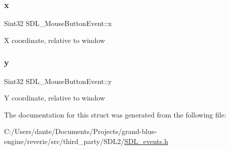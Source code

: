 \subsubsection{\texorpdfstring{x}{x}}
{\footnotesize\ttfamily Sint32 S\+D\+L\+\_\+\+Mouse\+Button\+Event\+::x}

X coordinate, relative to window \mbox{\label{struct_s_d_l___mouse_button_event_a7ccb5c55a7ddadce723f4ea6d5269540}} 
\subsubsection{\texorpdfstring{y}{y}}
{\footnotesize\ttfamily Sint32 S\+D\+L\+\_\+\+Mouse\+Button\+Event\+::y}

Y coordinate, relative to window 

The documentation for this struct was generated from the following file\+:\begin{DoxyCompactItemize}
\item 
C\+:/\+Users/dante/\+Documents/\+Projects/grand-\/blue-\/engine/reverie/src/third\+\_\+party/\+S\+D\+L2/\mbox{\hyperlink{_s_d_l__events_8h}{S\+D\+L\+\_\+events.\+h}}\end{DoxyCompactItemize}
